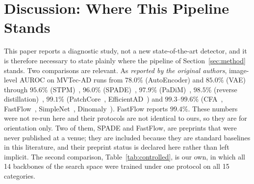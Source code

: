 
\section{Discussion: Where This Pipeline Stands}
\label{sec:positioning}

This paper reports a diagnostic study, not a new state-of-the-art detector, and it
is therefore necessary to state plainly where the pipeline of
Section~\ref{sec:method} stands. Two comparisons are relevant. As \emph{reported by
the original authors}, image-level AUROC on MVTec-AD runs from $78.0\%$
(AutoEncoder) and $85.0\%$ (VAE)~\cite{bergmann2018improving} through $95.6\%$
(STPM)~\cite{wang2021stpm}, $96.0\%$ (SPADE)~\cite{cohen2020spade}, $97.9\%$
(PaDiM)~\cite{defard2021padim}, $98.5\%$
(reverse distillation)~\cite{deng2022reverse}, $99.1\%$
(PatchCore~\cite{roth2022patchcore}, EfficientAD~\cite{batzner2024efficientad}) and
$99.3$--$99.6\%$
(CFA~\cite{lee2022cfa}, FastFlow~\cite{yu2021fastflow},
SimpleNet~\cite{liu2023simplenet}, Dinomaly~\cite{guo2025dinomaly}). FastFlow
reports $99.4\%$. These numbers were not re-run here and their protocols are not
identical to ours, so they are for orientation only. Two of them, SPADE and
FastFlow, are preprints that were never published at a venue; they are included
because they are standard baselines in this literature, and their preprint status
is declared here rather than left implicit. The second comparison,
Table~\ref{tab:controlled}, is our own, in which all 14 backbones of the search
space were trained under one protocol on all 15 categories.

